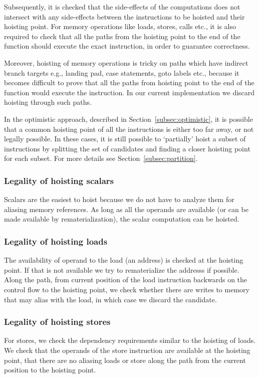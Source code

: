 \documentclass{sig-alternate}
\begin{document}
Subsequently, it is checked that the side-effects of the computations does not
intersect with any side-effects between the instructions to be hoisted and their
hoisting point. For memory operations like loads, stores, calls etc., it is also
required to check that all the paths from the hoisting point to the end of the
function should execute the exact instruction, in order to guarantee
correctness.

Moreover, hoisting of memory operations is tricky on paths which have indirect
branch targets e.g., landing pad, case statements, goto labels etc., because it
becomes difficult to prove that all the paths from hoisting point to the end of
the function would execute the instruction. In our current implementation we
discard hoisting through such paths.

In the optimistic approach, described in Section~\ref{subsec:optimistic}, it is
possible that a common hoisting point of all the instructions is either too far
away, or not legally possible. In these cases, it is still possible to
`partially' hoist a subset of instructions by splitting the set of candidates
and finding a closer hoisting point for each subset. For more details see
Section~\ref{subsec:partition}.

\subsubsection{Legality of hoisting scalars}
Scalars are the easiest to hoist because we do not have to analyze them for
aliasing memory references. As long as all the operands are available (or can be
made available by rematerialization), the scalar computation can be hoisted.

\subsubsection{Legality of hoisting loads}
The availability of operand to the load (an address) is checked at the hoisting
point. If that is not available we try to rematerialize the addresss if
possible.  Along the path, from current position of the load instruction
backwards on the control flow to the hoisting point, we check whether there are
writes to memory that may alias with the load, in which case we discard the
candidate.

\subsubsection{Legality of hoisting stores}
For stores, we check the dependency requirements similar to the hoisting of
loads. We check that the operands of the store instruction are available at the
hoisting point, that there are no aliasing loads or store along the path from
the current position to the hoisting point.
\end{document}
